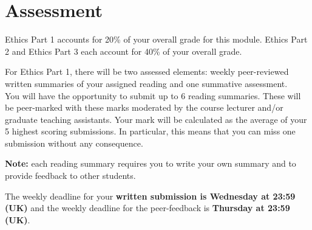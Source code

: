 \documentclass[
]{book}
\theoremstyle{definition}
\theoremstyle{definition}
\theoremstyle{definition}
\theoremstyle{definition}
\theoremstyle{remark}
\begin{document}
\hypertarget{assessment}{%
\section{Assessment}\label{assessment}}

Ethics Part 1 accounts for 20\% of your overall grade for this module.
Ethics Part 2 and Ethics Part 3 each account for 40\% of your overall
grade.

For Ethics Part 1, there will be two assessed elements: weekly
peer-reviewed written summaries of your assigned reading and one
summative assessment.\\
You will have the opportunity to submit up to 6 reading summaries. These
will be peer-marked with these marks moderated by the course lecturer
and/or graduate teaching assistants. Your mark will be calculated as the
average of your 5 highest scoring submissions. In particular, this means
that you can miss one submission without any consequence.

\textbf{Note:} each reading summary requires you to write your own summary
and to provide feedback to other students.

The weekly deadline for your \textbf{written submission is Wednesday at 23:59
(UK)} and the weekly deadline for the peer-feedback is \textbf{Thursday at
23:59 (UK)}.
\end{document}
